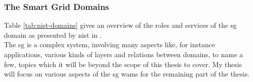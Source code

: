 

\subsubsection{The Smart Grid Domains}

Table \ref{tab:nist-domains} gives an overview of the roles and services of the \acrshort{sg} domain as presented by \acrshort{nist} in \cite{gopstein2021nist}.\\  

The \acrlong{sg} is a complex system, involving many aspects like, for instance applications, various kinds of layers and relations between domains, to name a few, topics which it will be beyond the scope of this thesis to cover. My thesis will focus on various aspects of the \acrshort{sg} \acrlong{wams} for the remaining part of the thesis.










